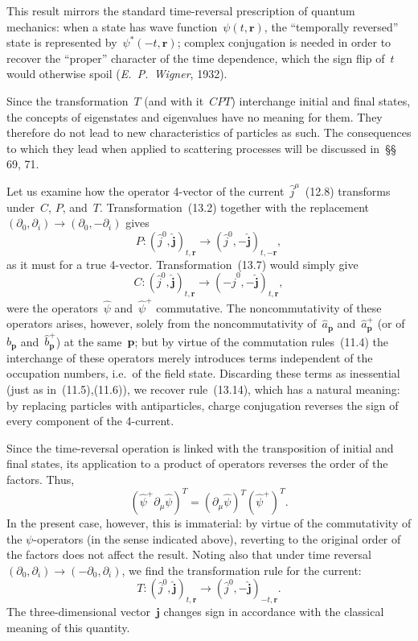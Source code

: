 This result mirrors the standard time-reversal prescription of quantum mechanics: when a state has wave function~$\psi(t,\mathbf{r})$, the ``temporally reversed'' state is represented by~$\psi^*(-t,\mathbf{r})$; complex conjugation is needed in order to recover the ``proper'' character of the time dependence, which the sign flip of~$t$ would otherwise spoil (\emph{E.~P.~Wigner}, 1932).

Since the transformation~$T$ (and with it~$CPT$) interchange initial and final states, the concepts of eigenstates and eigenvalues have no meaning for them. They therefore do not lead to new characteristics of particles as such. The consequences to which they lead when applied to scattering processes will be discussed in~\S\S\,69, 71.

Let us examine how the operator 4-vector of the current~$\hat{j}^\mu$~(12.8) transforms under~$C$, $P$, and~$T$. Transformation~(13.2) together with the replacement $(\partial_0, \partial_i) \to (\partial_0, -\partial_i)$ gives
\begin{equation}
P:(\hat{j}^0, \hat{\mathbf{j}})_{t,\mathbf{r}} \to (\hat{j}^0, -\hat{\mathbf{j}})_{t,-\mathbf{r}},
\tag{13.13}
\end{equation}
as it must for a true 4-vector. Transformation~(13.7) would simply give
\begin{equation}
C:(\hat{j}^0, \hat{\mathbf{j}})_{t,\mathbf{r}} \to (-\hat{j}^0, -\hat{\mathbf{j}})_{t,\mathbf{r}},
\tag{13.14}
\end{equation}
were the operators~$\hat{\psi}$ and~$\hat{\psi}^+$ commutative. The noncommutativity of these operators arises, however, solely from the noncommutativity of~$\hat{a}_\mathbf{p}$ and~$\hat{a}^+_\mathbf{p}$ (or of~$\hat{b}_\mathbf{p}$ and~$\hat{b}^+_\mathbf{p}$) at the same~$\mathbf{p}$; but by virtue of the
commutation rules~(11.4) the interchange of these operators merely introduces terms independent of the occupation numbers, i.e.\ of the field state. Discarding these terms as inessential (just as in~(11.5),(11.6)), we recover rule~(13.14), which has a natural meaning: by replacing particles with antiparticles, charge conjugation reverses the sign of every component of the 4-current.

Since the time-reversal operation is linked with the transposition of initial and final states, its application to a product of operators reverses the order of the factors. Thus,
\[
\left(\hat{\psi}^+\partial_\mu\hat{\psi}\right)^T = \left(\partial_\mu\hat{\psi}\right)^T \left(\hat{\psi}^+\right)^T.
\]
In the present case, however, this is immaterial: by virtue of the commutativity of the $\psi$-operators (in the sense indicated above), reverting to the original order of the factors does not affect the result. Noting also that under time reversal $(\partial_0, \partial_i) \to (-\partial_0, \partial_i)$, we find the transformation rule for the current:
\begin{equation}
T:(\hat{j}^0, \hat{\mathbf{j}})_{t,\mathbf{r}} \to (\hat{j}^0, -\hat{\mathbf{j}})_{-t,\mathbf{r}}.
\tag{13.15}
\end{equation}
The three-dimensional vector~$\mathbf{j}$ changes sign in accordance with the classical meaning of this quantity.

